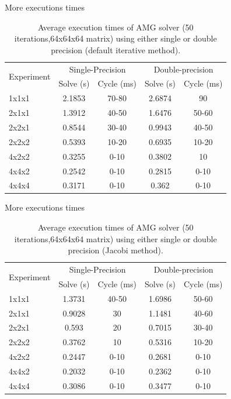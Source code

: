 \documentclass{beamer}
\begin{document}
\begin{frame}{More executions times}

  \begin{table}
  \begin{center}
   \begin{tabular}{|l|c|c|c|c|}
   \hline
    \multirow{2}{*}{Experiment} & \multicolumn{2}{c|}{Single-Precision} & \multicolumn{2}{c|}{Double-precision} \\
    \cline{2-5}
    & Solve (s) & Cycle (ms) & Solve (s) & Cycle (ms) \\
    \hline
    1x1x1 & 2.1853 & 70-80 & 2.6874 & 90 \\
    \hline
    2x1x1 & 1.3912 & 40-50 & 1.6476 & 50-60\\
    \hline
    2x2x1 & 0.8544 & 30-40 & 0.9943 & 40-50 \\
    \hline
    2x2x2 & 0.5393 & 10-20 & 0.6935 & 10-20 \\
    \hline
    4x2x2 & 0.3255 & 0-10 & 0.3802 & 10 \\
    \hline
    4x4x2 & 0.2542 & 0-10 & 0.2815 & 0-10 \\
    \hline
    4x4x4 & 0.3171 & 0-10 & 0.362 & 0-10 \\
    \hline
   \end{tabular}
   \end{center}
   \caption{Average execution times of AMG solver (50 iterations,64x64x64 matrix) using either single or double precision (default iterative method).}
   \label{table.time_measure1}
 \end{table}
\end{frame}

\begin{frame}{More executions times}
  \begin{table}
 \begin{center}
   \begin{tabular}{|l|c|c|c|c|}
   \hline
    \multirow{2}{*}{Experiment} & \multicolumn{2}{c|}{Single-Precision} & \multicolumn{2}{c|}{Double-precision} \\
    \cline{2-5}
    & Solve (s) & Cycle (ms) & Solve (s) & Cycle (ms) \\
    \hline
    1x1x1 & 1.3731 & 40-50 & 1.6986 & 50-60\\
    \hline
    2x1x1 & 0.9028 & 30 & 1.1481 & 40-60\\
    \hline
    2x2x1 & 0.593 & 20 & 0.7015 & 30-40 \\
    \hline
    2x2x2 & 0.3762 & 10 & 0.5316 & 10-20 \\
    \hline
    4x2x2 & 0.2447 & 0-10 & 0.2681 & 0-10 \\
    \hline
    4x4x2 & 0.2032 & 0-10 & 0.2362 & 0-10 \\
    \hline
    4x4x4 & 0.3086 & 0-10 & 0.3477 & 0-10 \\
    \hline
   \end{tabular}
 \end{center}
   \caption{Average execution times of AMG solver (50 iterations,64x64x64 matrix) using either single or double precision (Jacobi method).}
   \label{table.time_measure1}
 \end{table}
\end{frame}
\end{document}
